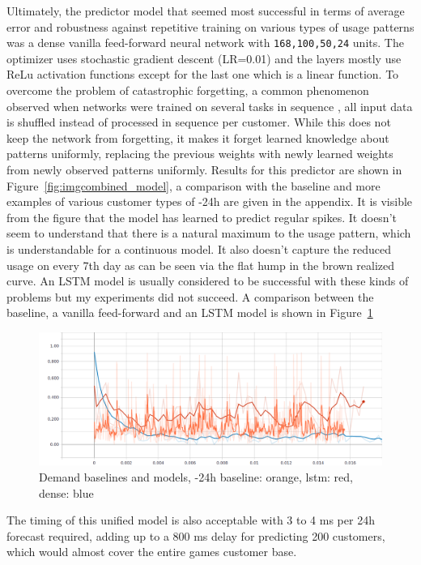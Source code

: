 Ultimately, the predictor model that seemed most successful in terms of average error and robustness against repetitive
training on various types of usage patterns was a dense vanilla feed-forward neural network with
\texttt{168,100,50,24} units. The optimizer uses stochastic gradient descent (LR=0.01) and the layers mostly use
\ac{ReLu} activation functions except for the last one which is a linear function. To overcome the problem of
catastrophic forgetting, a common phenomenon observed when networks were trained on several tasks in sequence
\citep{french1999catastrophic}, all input data is shuffled instead of processed in sequence per customer. While this
does not keep the network from forgetting, it makes it forget learned knowledge about patterns uniformly, replacing the
previous weights with newly learned weights from newly observed patterns uniformly. Results for this predictor are shown
in Figure~\ref{fig:imgcombined_model}, a comparison with the baseline and more examples of various customer types of
-24h are given in the appendix. It is visible from the figure that the model has learned to predict regular
spikes. It doesn't seem to understand that there is a natural maximum to the usage pattern, which is understandable for
a continuous model. It also doesn't capture the reduced usage on every 7th day as can be seen via the flat hump
in the brown realized curve. An \ac{LSTM} model is usually considered to be successful with these kinds of problems but
my experiments did not succeed. A comparison between the baseline, a vanilla feed-forward and an \ac{LSTM} model is
shown in Figure~\ref{fig:baseline_dense}

\begin{figure}[b]
    \centering
    \includegraphics[width=1.0\linewidth]{img/demand_baselines_2.png}
    \caption{Demand baselines and models, -24h baseline: orange, lstm: red, dense: blue}
    \label{fig:baseline_dense}
\end{figure}


The timing of this unified model is also acceptable with 3 to 4 ms per 24h forecast required, adding up to a 800 ms
delay for predicting 200 customers, which would almost cover the entire games customer base.

